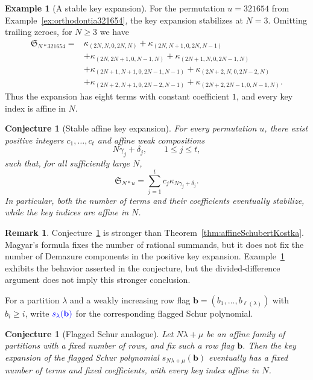 \documentclass[11pt,reqno]{amsart}
\newtheorem{conjecture}[theorem]{Conjecture}
\theoremstyle{definition}
\newtheorem{example}[theorem]{Example}
\newtheorem{remark}[theorem]{Remark}
\newcommand{\schubertS}{\mathfrak{S}}
\newcommand{\keypoly}{\kappa}
\newcommand{\stretchop}{\mathbin{\ast}}
\newcommand{\stretchperm}[2]{#1\stretchop #2}
\newcommand{\defin}[1]{%
  \relax\ifmmode%
  \textcolor{blue}{#1}%
  \else\textcolor{blue}{\emph{#1}}%
  \fi%
}
\begin{document}
\begin{example}[A stable key expansion]
\label{ex:stableKeyExpansion321654}
For the permutation \(u=321654\) from Example~\ref{ex:orthodontia321654},
the key expansion stabilizes at \(N=3\).  Omitting trailing zeroes, for
\(N\geq3\) we have
\[
\begin{aligned}
\schubertS_{\stretchperm{N}{321654}}
={}&
\keypoly_{(2N,N,0,2N,N)}
+\keypoly_{(2N,N+1,0,2N,N-1)}\\
&+\keypoly_{(2N,2N+1,0,N-1,N)}
+\keypoly_{(2N+1,N,0,2N-1,N)}\\
&+\keypoly_{(2N+1,N+1,0,2N-1,N-1)}
+\keypoly_{(2N+2,N,0,2N-2,N)}\\
&+\keypoly_{(2N+2,N+1,0,2N-2,N-1)}
+\keypoly_{(2N+2,2N-1,0,N-1,N)}.
\end{aligned}
\]
Thus the expansion has eight terms with constant coefficient \(1\), and every
key index is affine in \(N\).
\end{example}

\begin{conjecture}[Stable affine key expansion]
\label{conj:stableAffineKeyExpansion}
For every permutation \(u\), there exist positive integers \(c_1,\dotsc,c_t\)
and affine weak compositions
\[
N\gamma_j+\delta_j,
\qquad 1\leq j\leq t,
\]
such that, for all sufficiently large \(N\),
\[
\schubertS_{\stretchperm{N}{u}}
=
\sum_{j=1}^t
c_j\keypoly_{N\gamma_j+\delta_j}.
\]
In particular, both the number of terms and their coefficients eventually
stabilize, while the key indices are affine in \(N\).
\end{conjecture}

\begin{remark}
Conjecture~\ref{conj:stableAffineKeyExpansion} is stronger than
Theorem~\ref{thm:affineSchubertKostka}.  Magyar's formula fixes the number of
rational summands, but it does not fix the number of Demazure components in
the positive key expansion.  Example~\ref{ex:stableKeyExpansion321654}
exhibits the behavior asserted in the conjecture, but the divided-difference
argument does not imply this stronger conclusion.
\end{remark}

For a partition \(\lambda\) and a weakly increasing row flag
\(\mathbf b=(b_1,\dotsc,b_{\ell(\lambda)})\) with \(b_i\geq i\), write
\(\defin{s_\lambda(\mathbf b)}\) for the corresponding flagged Schur
polynomial.

\begin{conjecture}[Flagged Schur analogue]
\label{conj:stableFlaggedSchurKeyExpansion}
Let \(N\lambda+\mu\) be an affine family of partitions with a fixed number of
rows, and fix such a row flag \(\mathbf b\).  Then the key expansion of
the flagged Schur polynomial \(s_{N\lambda+\mu}(\mathbf b)\) eventually has a
fixed number of terms and fixed coefficients, with every key index affine in
\(N\).
\end{conjecture}
\end{document}
